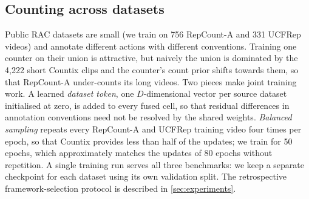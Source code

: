 \subsection{Counting across datasets}
\label{sec:joint}
Public RAC datasets are small (we train on 756 RepCount-A and 331 UCFRep videos)
and annotate different actions with different conventions. Training one counter
on their union is attractive, but naively the union is dominated by the 4{,}222
short Countix clips and the counter's count prior shifts towards them, so that
RepCount-A under-counts its long videos. Two pieces make joint training work.
A learned \emph{dataset token}, one $D$-dimensional vector per
source dataset initialised at zero, is added to every fused cell, so that
residual differences in annotation conventions need not be resolved by the
shared weights. \emph{Balanced sampling} repeats every RepCount-A and UCFRep
training video four times per epoch, so that Countix provides less than half of
the updates; we train for 50 epochs, which approximately matches the updates of
80 epochs without repetition. A single training run serves all three
benchmarks: we keep a separate checkpoint for each dataset using its own
validation split. The retrospective framework-selection protocol is described
in \cref{sec:experiments}.

